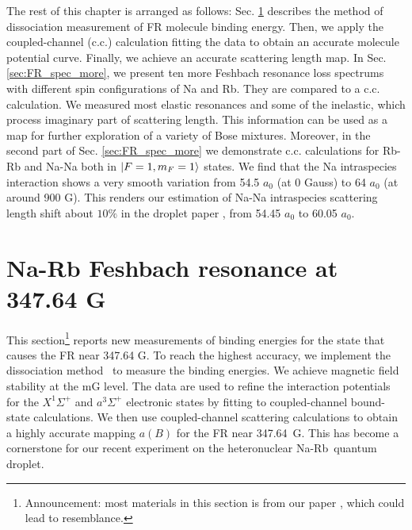 The rest of this chapter is arranged as follows: Sec. \ref{sec:cali_FR} describes the method of dissociation measurement of FR molecule binding energy. Then, we apply the coupled-channel (c.c.) calculation fitting the data to obtain an accurate molecule potential curve. Finally, we achieve an accurate scattering length map. In Sec. \ref{sec:FR_spec_more}, we present ten more Feshbach resonance loss spectrums with different spin configurations of Na and Rb. They are compared to a c.c. calculation. We measured most elastic resonances and some of the inelastic, which process imaginary part of scattering length. This information can be used as a map for further exploration of a variety of Bose mixtures. Moreover, in the second part of Sec. \ref{sec:FR_spec_more} we demonstrate c.c. calculations for Rb-Rb and Na-Na both in $\ket{F=1,m_F=1}$ states. We find that the Na intraspecies interaction shows a very smooth variation from 54.5 $a_0$ (at 0 Gauss) to 64 $a_0$ (at around 900 G). This renders our estimation of Na-Na intraspecies scattering length shift about $10\%$ in the droplet paper \cite{guo2021leehuangyang}, from 54.45 $a_0$ to 60.05 $a_0$.

\section{Na-Rb Feshbach resonance at 347.64 G}
\label{sec:cali_FR}

This section\footnote{Announcement: most materials in this section is from our paper \cite{guo2021tunable}, which could lead to resemblance.} reports new measurements of binding energies for the state that causes the FR near 347.64 G. To reach the highest accuracy, we implement the dissociation method~\cite{Bartenstein2005,Zurn2013,Chin2005radio,Chapurin2019} to measure the binding energies. We achieve magnetic field stability at the mG level. The data are used to refine the interaction potentials for the $X^1\Sigma^+$ and $a^3\Sigma^+$ electronic states by fitting to coupled-channel bound-state calculations. We then use coupled-channel scattering calculations to obtain a highly accurate mapping $a(B)$ for the FR near 347.64~G. This has become a cornerstone for our recent experiment on the heteronuclear Na-Rb~quantum droplet\cite{guo2021leehuangyang}. 

